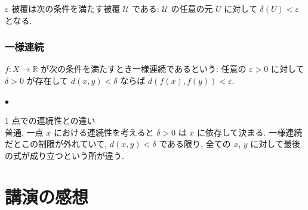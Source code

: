 \documentclass[openany, a4paper, oneside]{jsbook}
\newcounter{enum2}
\renewenvironment{itemize}{%
\begin{list}{$\bullet$\ \ }%
{%
\usecounter{enum2}
\setlength{\itemindent}{0pt}%
\setlength{\leftmargin}{15pt}%
\setlength{\rightmargin}{0pt}%
\setlength{\labelsep}{0pt}%
\setlength{\labelwidth}{6pt}%
\setlength{\itemsep}{0pt}%
\setlength{\parsep}{0pt}%
\setlength{\listparindent}{0pt}%
}
}{%
\end{list}%
}
\theoremstyle{break}
\theoremstyle{breakdefn}
\begin{document}
$\varepsilon$ 被覆は次の条件を満たす被覆 $\mathcal{U}$ である:
$\mathcal{U}$ の任意の元 $U$ に対して $\delta (U) < \varepsilon$ となる.
\subsubsection{一様連続}


$f \colon X \to \mathbb{R}$ が次の条件を満たすとき一様連続であるという:
任意の $\varepsilon > 0$ に対して $\delta > 0$ が存在して $d (x, y) < \delta$ ならば $d (f (x), f (y)) < \varepsilon$.
\begin{itemize}

\item 1 点での連続性との違い\\
%
普通, 一点 $x$ における連続性を考えると $\delta > 0$ は $x$ に依存して決まる.
一様連続だとこの制限が外れていて, $d (x, y) < \delta$ である限り, 全ての $x$, $y$ に対して最後の式が成り立つという所が違う.
\end{itemize} %
\section{講演の感想}
\end{document}
